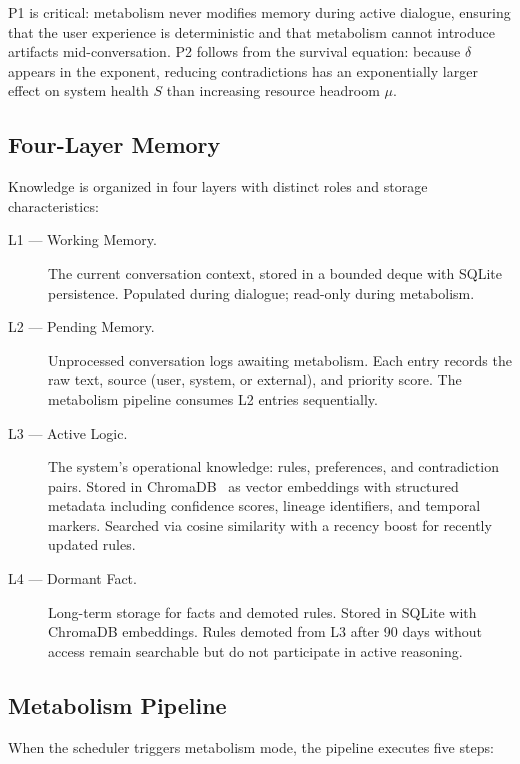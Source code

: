 \documentclass[11pt,a4paper]{article}
\begin{document}
P1 is critical: metabolism never modifies memory during active dialogue, ensuring that the user experience is deterministic and that metabolism cannot introduce artifacts mid-conversation.
P2 follows from the survival equation: because $\delta$ appears in the exponent, reducing contradictions has an exponentially larger effect on system health $S$ than increasing resource headroom $\mu$.

\subsection{Four-Layer Memory}

Knowledge is organized in four layers with distinct roles and storage characteristics:

\begin{description}\item[L1 --- Working Memory.] The current conversation context, stored in a bounded deque with SQLite persistence. Populated during dialogue; read-only during metabolism.
\item[L2 --- Pending Memory.] Unprocessed conversation logs awaiting metabolism. Each entry records the raw text, source (user, system, or external), and priority score. The metabolism pipeline consumes L2 entries sequentially.
\item[L3 --- Active Logic.] The system's operational knowledge: rules, preferences, and contradiction pairs. Stored in ChromaDB~\citep{chromadb} as vector embeddings with structured metadata including confidence scores, lineage identifiers, and temporal markers. Searched via cosine similarity with a recency boost for recently updated rules.
\item[L4 --- Dormant Fact.] Long-term storage for facts and demoted rules. Stored in SQLite with ChromaDB embeddings. Rules demoted from L3 after 90 days without access remain searchable but do not participate in active reasoning.
\end{description}

\subsection{Metabolism Pipeline}

When the scheduler triggers metabolism mode, the pipeline executes five steps:
\end{document}
